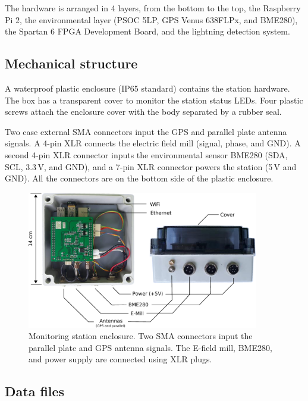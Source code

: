 \documentclass[letterpaper,12pt]{article}
\begin{document}
The hardware is arranged in 4 layers, from the bottom to the top, the Raspberry Pi 2, the environmental layer (PSOC 5LP, GPS Venus 638FLPx, and BME280), the Spartan 6 FPGA Development Board, and the lightning detection system.

\subsection{Mechanical structure}
A waterproof plastic enclosure (IP65 standard) contains the station hardware. The box has a transparent cover to monitor the station status LEDs. Four plastic screws attach the enclosure cover with the body separated by a rubber seal.

Two case external SMA connectors input the GPS and parallel plate antenna signals. A 4-pin XLR connects the electric field mill (signal, phase, and GND). A second 4-pin XLR connector inputs the environmental sensor BME280 (SDA, SCL, 3.3\,V, and GND), and a 7-pin XLR connector powers the station (5\,V and GND). All the connectors are on the bottom side of the plastic enclosure.

\begin{figure}[h!]
\begin{center}
\includegraphics[width=0.9\textwidth]{Figures/Station_structure.eps}
\caption{Monitoring station enclosure. Two SMA connectors input the parallel plate and GPS antenna signals. The E-field mill, BME280, and power supply are connected using XLR plugs.}
\label{fig::station}
\end{center}
\end{figure}

\subsection{Data files}
\end{document}
